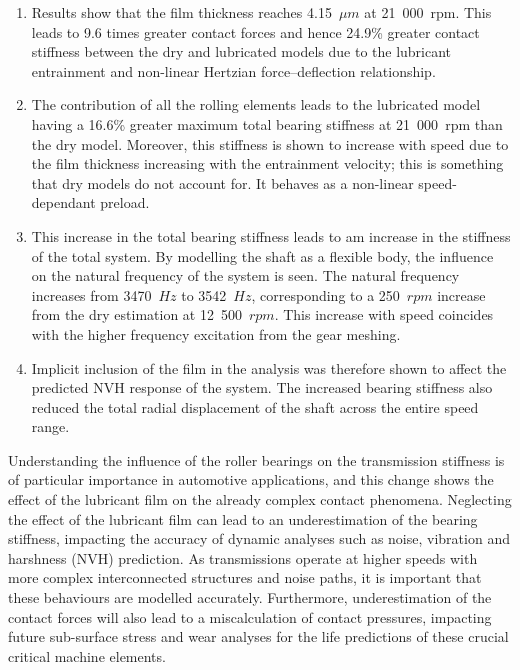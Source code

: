 \begin{enumerate} 
	\item Results show that the film thickness reaches 4.15~${\mu m}$ at 21~000~$\mathrm{rpm}$. This leads to 9.6 times greater contact forces and hence 24.9\% greater contact stiffness between the dry and lubricated models due to the lubricant entrainment and non-linear Hertzian force–deflection relationship. 
	\item The contribution of all the rolling elements leads to the lubricated model having a 16.6\% greater maximum total bearing stiffness at 21~000~$\mathrm{rpm}$ than the dry model. Moreover, this stiffness is shown to increase with speed due to the film thickness increasing with the entrainment velocity; this is something that dry models do not account for. It behaves as a non-linear speed-dependant preload.
	\item This increase in the total bearing stiffness leads to am increase in the stiffness of the total system. By modelling the shaft as a flexible body, the influence on the natural frequency of the system is seen. The natural frequency increases from 3470~$Hz$ to 3542~$Hz$, corresponding to a 250~$rpm$ increase from the dry estimation at 12~500~$rpm$. This increase with speed coincides with the higher frequency excitation from the gear meshing.
	\item Implicit inclusion of the film in the analysis was therefore shown to affect the predicted NVH response of the system. The increased bearing stiffness also reduced the total radial displacement of the shaft across the entire speed range.
\end{enumerate}

Understanding the influence of the roller bearings on the transmission stiffness is of particular importance in automotive applications, and this change shows the effect of the lubricant film on the already complex contact phenomena. Neglecting the effect of the lubricant film can lead to an underestimation of the bearing stiffness, impacting the accuracy of dynamic analyses such as noise, vibration and harshness (NVH) prediction. As transmissions operate at higher speeds with more complex interconnected structures and noise paths, it is important that these behaviours are modelled accurately. Furthermore, underestimation of the contact forces will also lead to a miscalculation of contact pressures, impacting future sub-surface stress and wear analyses for the life predictions of these crucial critical  machine elements.


